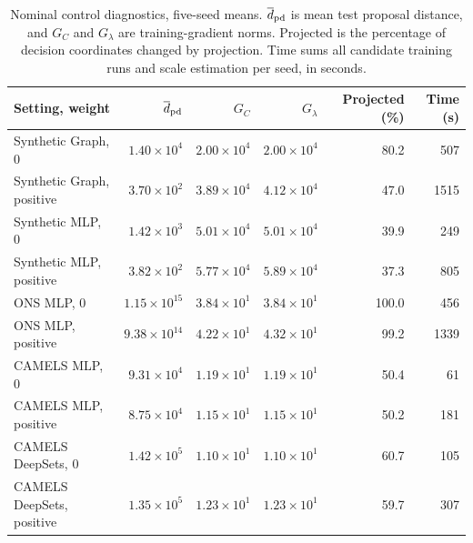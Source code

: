 \begin{table}[ht]
\caption{Nominal control diagnostics, five-seed means. $\overline d_{\rm pd}$ is mean test
proposal distance, and $G_C$ and $G_\lambda$ are training-gradient norms.
Projected is the percentage of decision coordinates changed by projection.
Time sums all candidate
training runs and scale estimation per seed, in seconds.}
\label{tab:regularization-metrics}
\centering\scriptsize
\setlength{\tabcolsep}{2.5pt}
\begin{tabular}{@{}lrrrrr@{}}
\toprule
Setting, weight & $\overline d_{\rm pd}$ & $G_C$ & $G_\lambda$ & Projected (\%) & Time (s)\\
\midrule
Synthetic Graph, 0 & $1.40\times10^{4}$ & $2.00\times10^{4}$ & $2.00\times10^{4}$ & 80.2 & 507\\
Synthetic Graph, positive & $3.70\times10^{2}$ & $3.89\times10^{4}$ & $4.12\times10^{4}$ & 47.0 & 1515\\
Synthetic MLP, 0 & $1.42\times10^{3}$ & $5.01\times10^{4}$ & $5.01\times10^{4}$ & 39.9 & 249\\
Synthetic MLP, positive & $3.82\times10^{2}$ & $5.77\times10^{4}$ & $5.89\times10^{4}$ & 37.3 & 805\\
ONS MLP, 0 & $1.15\times10^{15}$ & $3.84\times10^{1}$ & $3.84\times10^{1}$ & 100.0 & 456\\
ONS MLP, positive & $9.38\times10^{14}$ & $4.22\times10^{1}$ & $4.32\times10^{1}$ & 99.2 & 1339\\
CAMELS MLP, 0 & $9.31\times10^{4}$ & $1.19\times10^{1}$ & $1.19\times10^{1}$ & 50.4 & 61\\
CAMELS MLP, positive & $8.75\times10^{4}$ & $1.15\times10^{1}$ & $1.15\times10^{1}$ & 50.2 & 181\\
CAMELS DeepSets, 0 & $1.42\times10^{5}$ & $1.10\times10^{1}$ & $1.10\times10^{1}$ & 60.7 & 105\\
CAMELS DeepSets, positive & $1.35\times10^{5}$ & $1.23\times10^{1}$ & $1.23\times10^{1}$ & 59.7 & 307\\
\bottomrule
\end{tabular}
\end{table}
